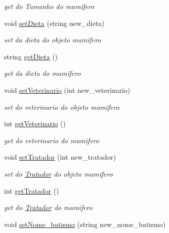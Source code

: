 \begin{DoxyCompactItemize}
\begin{DoxyCompactList}\small\item\em get do Tamanho do mamifero \end{DoxyCompactList}\item 
void \mbox{\hyperlink{class_mamifero_af9072b6a5e202606b9b8c7c71c5318d4}{set\+Dieta}} (string new\+\_\+dieta)
\begin{DoxyCompactList}\small\item\em set da dieta do objeto mamifero \end{DoxyCompactList}\item 
string \mbox{\hyperlink{class_mamifero_ad57356460a0ca116426126c8147b1efa}{get\+Dieta}} ()
\begin{DoxyCompactList}\small\item\em get da dieta do mamifero \end{DoxyCompactList}\item 
void \mbox{\hyperlink{class_mamifero_a3b617e8eccf40e0af42bc8957491dfe6}{set\+Veterinario}} (int new\+\_\+veterinario)
\begin{DoxyCompactList}\small\item\em set do veterinario do objeto mamifero \end{DoxyCompactList}\item 
int \mbox{\hyperlink{class_mamifero_a11888abffb8a926994838ef0672564d7}{get\+Veterinario}} ()
\begin{DoxyCompactList}\small\item\em get do veterinario do mamifero \end{DoxyCompactList}\item 
void \mbox{\hyperlink{class_mamifero_ac1cfa5b28c2102e99ebee856afad63b1}{set\+Tratador}} (int new\+\_\+tratador)
\begin{DoxyCompactList}\small\item\em set do \mbox{\hyperlink{class_tratador}{Tratador}} do objeto mamifero \end{DoxyCompactList}\item 
int \mbox{\hyperlink{class_mamifero_a079d70495494cbd644371345462d6163}{get\+Tratador}} ()
\begin{DoxyCompactList}\small\item\em get do \mbox{\hyperlink{class_tratador}{Tratador}} do mamifero \end{DoxyCompactList}\item 
void \mbox{\hyperlink{class_mamifero_a884f25c24051f7c8a5c4e6227317308a}{set\+Nome\+\_\+batismo}} (string new\+\_\+nome\+\_\+batismo)

\end{DoxyCompactItemize}
